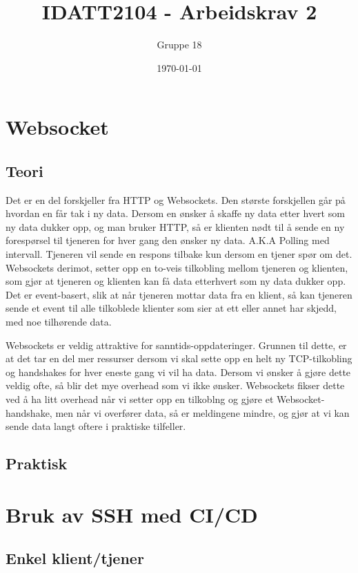 \documentclass[12pt]{article}
\title{IDATT2104 - Arbeidskrav 2}
\author{Gruppe 18}
\date{\today}
\begin{document}
    \maketitle
    \newpage

    \tableofcontents

    \newpage

    
    \section{Websocket}
    \subsection{Teori}
    Det er en del forskjeller fra HTTP og Websockets. Den største forskjellen går på hvordan en får tak i ny data.
    Dersom en ønsker å skaffe ny data etter hvert som ny data dukker opp, og man bruker HTTP, så er klienten 
    nødt til å sende en ny forespørsel til tjeneren for hver gang den ønsker ny data. A.K.A Polling med intervall. 
    Tjeneren vil sende en respons tilbake kun dersom en tjener spør om det.
    Websockets derimot, setter opp en to-veis tilkobling mellom tjeneren og klienten, som gjør at tjeneren og 
    klienten kan få data etterhvert som ny data dukker opp. Det er event-basert, slik at når tjeneren mottar data 
    fra en klient, så kan tjeneren sende et event til alle tilkoblede klienter som sier at ett eller annet har skjedd, 
    med noe tilhørende data.
    
    Websockets er veldig attraktive for sanntids-oppdateringer. Grunnen til dette, er at det tar en del mer ressurser 
    dersom vi skal sette opp en helt ny TCP-tilkobling og handshakes for hver eneste gang vi vil ha data. Dersom vi 
    ønsker å gjøre dette veldig ofte, så blir det mye overhead som vi ikke ønsker. Websockets fikser dette ved å ha 
    litt overhead når vi setter opp en tilkoblng og gjøre et Websocket-handshake, men når vi overfører data, så 
    er meldingene mindre, og gjør at vi kan sende data langt oftere i praktiske tilfeller.


    
    \subsection{Praktisk}
    \section{Bruk av SSH med CI/CD}
    \subsection{Enkel klient/tjener}
    
    
\end{document}
